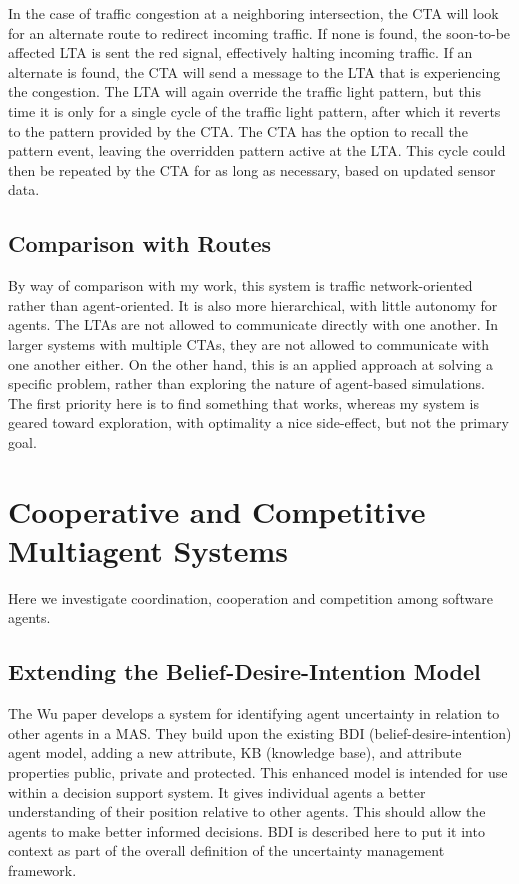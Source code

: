 \documentclass[11pt,letterpaper,onecolumn,twoside,openright,draft]{report}
\begin{document}
In the case of traffic congestion at a neighboring intersection, the CTA will look for an alternate route to redirect incoming traffic.
If none is found, the soon-to-be affected LTA is sent the red signal, effectively halting incoming traffic.
If an alternate is found, the CTA will send a message to the LTA that is experiencing the congestion.
The LTA will again override the traffic light pattern, but this time it is only for a single cycle of the traffic light pattern, after which it reverts to the pattern provided by the CTA.
The CTA has the option to recall the pattern event, leaving the overridden pattern active at the LTA.
This cycle could then be repeated by the CTA for as long as necessary, based on updated sensor data.

\subsection{Comparison with Routes}
By way of comparison with my work, this system is traffic network-oriented rather than agent-oriented.
It is also more hierarchical, with little autonomy for agents.
The LTAs are not allowed to communicate directly with one another.
In larger systems with multiple CTAs, they are not allowed to communicate with one another either.
On the other hand, this is an applied approach at solving a specific problem, rather than exploring the nature of agent-based simulations.
The first priority here is to find something that works, whereas my system is geared toward exploration, with optimality a nice side-effect, but not the primary goal.

\section{Cooperative and Competitive Multiagent Systems}
Here we investigate coordination, cooperation and competition among software agents.

\subsection{Extending the Belief-Desire-Intention Model}
The Wu paper\cite{wu2003umf} develops a system for identifying agent uncertainty in relation to other agents in a MAS.
They build upon the existing BDI (belief-desire-intention) agent model, adding
a new attribute, KB (knowledge base), and attribute properties public, private and protected.
This enhanced model is intended for use within a decision support system.
It gives individual agents a better understanding of their position relative to other agents.
This should allow the agents to make better informed decisions.
BDI is described here to put it into context as part of the overall definition of the uncertainty management framework.
\end{document}
